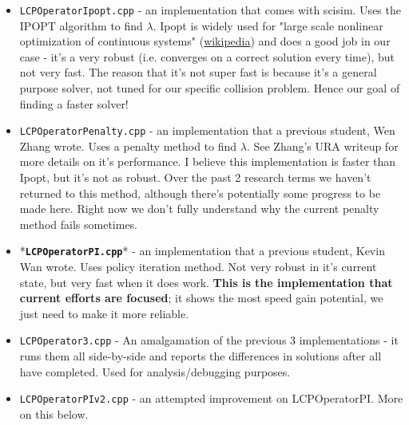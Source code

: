\documentclass[12pt]{article}
\begin{document}
\begin{itemize}{}{\setlength{\leftmargin}{0.25cm}}
    \item \texttt{LCPOperatorIpopt.cpp} - an implementation that comes with scisim.
    Uses the IPOPT algorithm to find $\lambda$.
    Ipopt is widely used for "large scale nonlinear optimization of continuous systems"
    (\href{https://en.wikipedia.org/wiki/IPOPT}{wikipedia}) and does a good job in our case -
    it's a very robust (i.e. converges on a correct solution every time), but not very fast.
    The reason that it's not super fast is because it's a general purpose solver,
    not tuned for our specific collision problem. Hence our goal of finding a faster solver!
    
    \item \texttt{LCPOperatorPenalty.cpp} - an implementation that a previous student, Wen Zhang wrote.
    Uses a penalty method to find $\lambda$. See Zhang's URA writeup for more details on it's performance.
    I believe this implementation is faster than Ipopt, but it's not as robust.
    Over the past 2 research terms we haven't returned to this method, although there's potentially some progress to be made here.
    Right now we don't fully understand why the current penalty method fails sometimes.

    \item *\textbf{\texttt{LCPOperatorPI.cpp}}* - an implementation that a previous student, Kevin Wan wrote.
    Uses policy iteration method.
    Not very robust in it's current state, but very fast when it does work.
    \textbf{This is the implementation that current efforts are focused};
    it shows the most speed gain potential, we just need to make it more reliable.

    \item \texttt{LCPOperator3.cpp} - 
    An amalgamation of the previous 3 implementations - it runs them all side-by-side and reports the differences in solutions after all have completed.
    Used for analysis/debugging purposes.

    \item \texttt{LCPOperatorPIv2.cpp} - an attempted improvement on LCPOperatorPI.
    More on this below.
    

\end{itemize}
\end{document}
